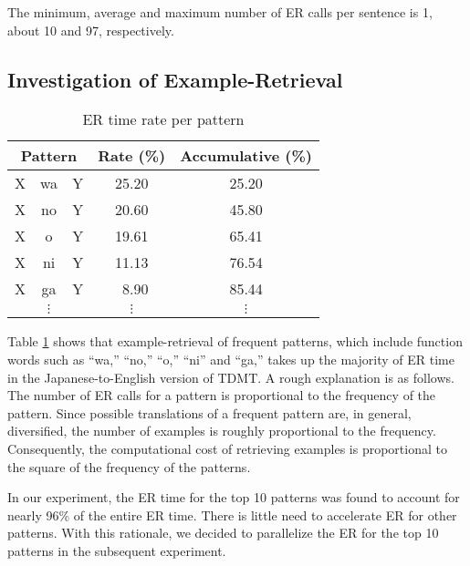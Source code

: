 The minimum, average and maximum 
number of ER calls per sentence is 1, about 10 and 97, \vspace*{-0.7ex}
respectively.


\subsection{Investigation of Example-Retrieval}\label{sec-investigation}

\begin{table}[b]
  \begin{center}
    \caption{ER time rate per pattern}  
    \label{tbl-dist-time}
    \def\arraystretch{}
    \begin{tabular}{|ccc|c|c|} \hline
      \multicolumn{3}{|c|}{\strut Pattern} & Rate (\%) & Accumulative (\%) \\\hline
      \strut
       X & wa       & Y & 25.20         & 25.20 \\
       X & no       & Y & 20.60         & 45.80 \\
       X & o        & Y & 19.61         & 65.41 \\
       X & ni       & Y & 11.13         & 76.54 \\
       X & ga       & Y & ~8.90         & 85.44 \\[-0.8ex]
         & $\vdots$ &   & $\vdots$      & $\vdots$  \\ \hline
    \end{tabular}
  \end{center}
\end{table}

 Table \ref{tbl-dist-time}  shows that 
example-retrieval of frequent patterns, which include function words 
such as ``wa,'' ``no,'' ``o,'' ``ni'' and ``ga,''
takes up the majority of  ER time in the Japanese-to-English version of TDMT. 
A rough explanation is as follows.
The number of ER calls for a pattern is proportional to 
the frequency of the pattern.
Since possible translations of a frequent pattern are, in general,  
diversified,
the number of examples is roughly proportional to the frequency.
Consequently, the computational cost of retrieving examples
is proportional to the square of the frequency of the patterns.

In our experiment, the ER time for the top 10 patterns 
was found to account for nearly 96\% of the entire ER time.
There is little need to accelerate ER for other patterns.
 With this rationale, we decided to parallelize the ER
for the top 10 patterns
in the subsequent experiment.

